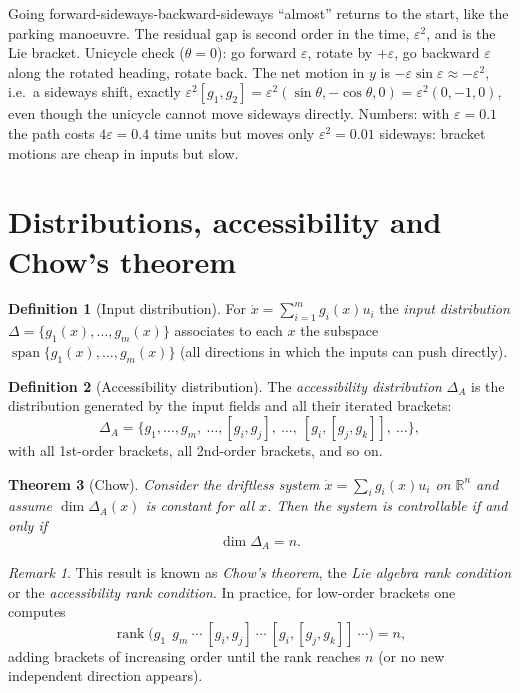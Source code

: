 \documentclass[11pt,a4paper]{article}
\DeclareMathOperator{\rank}{rank}
\DeclareMathOperator{\spn}{span}
\newcommand{\R}{\mathbb{R}}
\newcommand{\LB}[2]{[#1,#2]}
\newcommand{\Dist}{\Delta}
\newcommand{\AccDist}{\Delta_A}
\theoremstyle{definition}
\newtheorem{definition}{Definition}[section]
\theoremstyle{plain}
\newtheorem{theorem}[definition]{Theorem}
\theoremstyle{remark}
\newtheorem*{remark}{Remark}
\begin{document}
\begin{intuition}
Going forward-sideways-backward-sideways ``almost'' returns to the start, like the parking manoeuvre. The residual gap is second order in the time, $\varepsilon^2$, and is the Lie bracket. Unicycle check ($\theta=0$): go forward $\varepsilon$, rotate by $+\varepsilon$, go backward $\varepsilon$ along the rotated heading, rotate back. The net motion in $y$ is $-\varepsilon\sin\varepsilon\approx-\varepsilon^2$, i.e.\ a sideways shift, exactly $\varepsilon^2\LB{g_1}{g_2}=\varepsilon^2(\sin\theta,-\cos\theta,0)=\varepsilon^2(0,-1,0)$, even though the unicycle cannot move sideways directly. Numbers: with $\varepsilon=0.1$ the path costs $4\varepsilon=0.4$ time units but moves only $\varepsilon^2=0.01$ sideways: bracket motions are cheap in inputs but slow.
\end{intuition}

\section{Distributions, accessibility and Chow's theorem}

\begin{definition}[Input distribution]
For $\dot x=\sum_{i=1}^m g_i(x)u_i$ the \emph{input distribution} $\Dist=\{g_1(x),\dots,g_m(x)\}$ associates to each $x$ the subspace $\spn\{g_1(x),\dots,g_m(x)\}$ (all directions in which the inputs can push directly).
\end{definition}

\begin{definition}[Accessibility distribution]
The \emph{accessibility distribution} $\AccDist$ is the distribution generated by the input fields and all their iterated brackets:
\[
\AccDist=\Big\{g_1,\dots,g_m,\ \dots,\LB{g_i}{g_j},\ \dots,\ \LB{g_i}{\LB{g_j}{g_k}},\ \dots\Big\},
\]
with all 1st-order brackets, all 2nd-order brackets, and so on.
\end{definition}

\begin{theorem}[Chow]
\label{thm:chow}
Consider the driftless system $\dot x=\sum_i g_i(x)u_i$ on $\R^n$ and assume $\dim\AccDist(x)$ is constant for all $x$. Then the system is controllable if and only if
\[
\dim\AccDist=n .
\]
\end{theorem}

\begin{remark}
This result is known as \emph{Chow's theorem}, the \emph{Lie algebra rank condition} or the \emph{accessibility rank condition}. In practice, for low-order brackets one computes
\[
\rank\Big(g_1\ \ g_m\ \cdots\ \LB{g_i}{g_j}\ \cdots\ \LB{g_i}{\LB{g_j}{g_k}}\ \cdots\Big)=n,
\]
adding brackets of increasing order until the rank reaches $n$ (or no new independent direction appears).
\end{remark}
\end{document}

